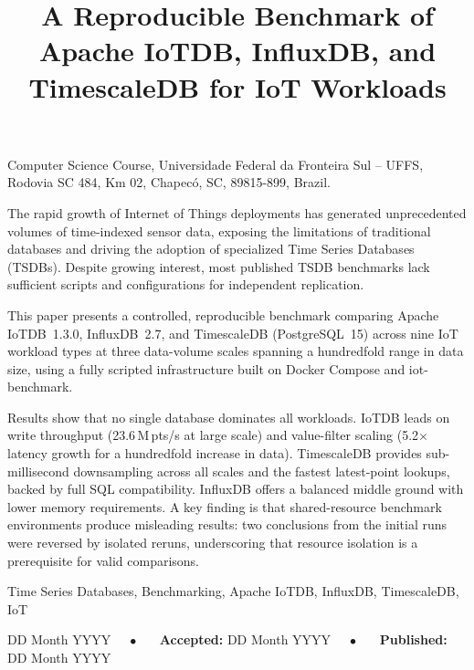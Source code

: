 \documentclass[english]{presets/sbcreviews-2025}%
\title[A Reproducible Benchmark of Apache IoTDB, InfluxDB, and TimescaleDB for IoT Workloads]{A Reproducible Benchmark of Apache IoTDB, InfluxDB, and TimescaleDB for IoT Workloads}
\author[Klein 2026]{
  \affil{\textbf{Luiz Fernando Klein}~\orcidlink{0009-0001-8949-3248}~\textcolor{blue}{\faEnvelope}~~[{Universidade Federal da Fronteira Sul - UFFS}~|\href{mailto: ...}{~{\textit{luizkleinfernando@gmail.com}}}~]}
}
\begin{document}
\begin{frontmatter}

  \maketitle

  \begin{mail}
    Computer Science Course, Universidade Federal da Fronteira Sul -- UFFS, Rodovia SC 484, Km 02, Chapecó, SC, 89815-899, Brazil.
  \end{mail}

  \begin{abstract-en}
    The rapid growth of Internet of Things deployments has generated unprecedented volumes of
    time-indexed sensor data, exposing the limitations of traditional databases and driving the
    adoption of specialized Time Series Databases (TSDBs). Despite growing interest, most published
    TSDB benchmarks lack sufficient scripts and configurations for independent replication.

    This paper presents a controlled, reproducible benchmark comparing Apache IoTDB~1.3.0,
    InfluxDB~2.7, and TimescaleDB (PostgreSQL~15) across nine IoT workload types at three
    data-volume scales spanning a hundredfold range in data size, using a fully scripted infrastructure
    built on Docker Compose and iot-benchmark.

    Results show that no single database dominates all workloads. IoTDB leads on write throughput
    (23.6\,M\,pts/s at large scale) and value-filter scaling (5.2$\times$ latency growth for
    a hundredfold increase in data). TimescaleDB provides sub-millisecond downsampling across all scales and the
    fastest latest-point lookups, backed by full SQL compatibility. InfluxDB offers a balanced
    middle ground with lower memory requirements. A key finding is that shared-resource benchmark
    environments produce misleading results: two conclusions from the initial runs were reversed
    by isolated reruns, underscoring that resource isolation is a prerequisite for valid comparisons.
  \end{abstract-en}

  \begin{keywords}
    Time Series Databases, Benchmarking, Apache IoTDB, InfluxDB, TimescaleDB, IoT
  \end{keywords}

  \begin{dates}
     DD Month YYYY~~~$\bullet$~~~
    {\sffamily\textbf{Accepted:}} DD Month YYYY~~~$\bullet$~~~
    {\sffamily\textbf{Published:}} DD Month YYYY

  \end{dates}


\end{frontmatter}
\end{document}

